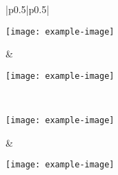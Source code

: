 \documentclass[8pt]{article}
\begin{document}
\noindent
\begin{tabular}{|p{0.5\textwidth}|p{0.5\textwidth}|}
\hline
\begin{minipage}[c][0.33\textheight][c]{\linewidth}
\centering
\texttt{[image: example-image]}
\label{fig:7}
\end{minipage}
&
\begin{minipage}[c][0.33\textheight][c]{\linewidth}
\centering
\texttt{[image: example-image]}
\captionsetup{labelformat=empty}
\label{fig:S1}
\end{minipage}
\\ \hline
\begin{minipage}[c][0.33\textheight][c]{\linewidth}
\centering
\texttt{[image: example-image]}
\captionsetup{labelformat=empty}
\label{fig:S2}
\end{minipage}
&
\begin{minipage}[c][0.33\textheight][c]{\linewidth}
\centering
\texttt{[image: example-image]}
\captionsetup{labelformat=empty}
\label{fig:S3}
\end{minipage}
\\ \hline
\end{tabular}
\end{document}
